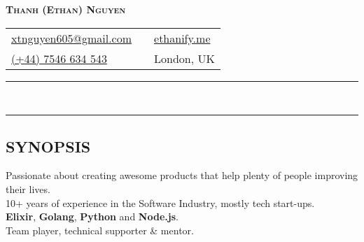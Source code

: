 \newcommand{\primary}[1]{\textcolor{primary}{\textbf{#1}}}
\newcommand{\secondary}[1]{\textcolor{secondary}{\textbf{#1}}}
\newcommand{\tertiary}[1]{\textcolor{tertiary}{#1}}

\newcommand{\tbullet}{\textcolor{tertiary}{\textbf{$\bullet$}}\space}
\newcommand{\at}{\textcolor{tertiary}{\textbf{@}}\space}
\newcommand{\then}{\textcolor{tertiary}{$\Rightarrow$}\space}

\newcommand{\keybase}{\textcolor{secondary}{\href{https://keybase.io/ethan605}{\faKey}}}
\newcommand{\github}{\textcolor{secondary}{\href{https://github.com/ethan605}{\faGithub}}}
\newcommand{\linkedin}{\textcolor{secondary}{\href{https://linkedin.com/in/ethan605}{\faLinkedin}}}

\pagestyle{empty}


\setlength\parindent{0pt}
\pagecolor{background}
\color{foreground}

\begin{center}
  \textcolor{primary}{\LARGE\bfseries\scshape{Thanh (Ethan) Nguyen}}
\end{center}

\begin{tabularx}{\textwidth}{
    @{}
    >{\raggedright\arraybackslash}X
    c
    >{\raggedleft\arraybackslash}X
    @{}
  }
  \href{mailto:xtnguyen605@gmail.com}{\textcolor{secondary}{xtnguyen605@gmail.com}} &
    \keybase \space \github \space \linkedin &
    \href{https://ethanify.me}{\textcolor{secondary}{ethanify.me}} \\
  \href{tel:447546634543}{(+44) 7546 634 543} & &
    London, UK \\
\end{tabularx}

\begin{spacing}{0.05}
\rule{\textwidth}{1pt} \\
\rule{\textwidth}{1pt}
\end{spacing}

\subsection*{SYNOPSIS}

Passionate about creating awesome products that help plenty of people improving their lives. \\
10+ years of experience in the Software Industry, mostly tech start-ups. \\
\textbf{Elixir}, \textbf{Golang}, \textbf{Python} and \textbf{Node.js}. \\
Team player, technical supporter \& mentor.

